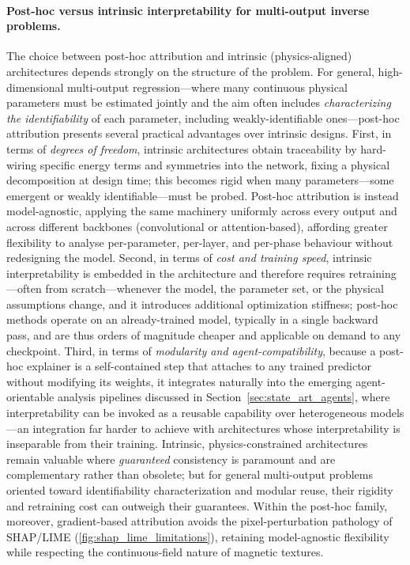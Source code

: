 \documentclass[letterpaper, 12, one column]{article}
\begin{document}
\paragraph{Post-hoc versus intrinsic interpretability for multi-output inverse problems.}
{\color[rgb]{0,0,1}The choice between post-hoc attribution and intrinsic (physics-aligned) architectures depends strongly on the structure of the problem. For general, high-dimensional multi-output regression---where many continuous physical parameters must be estimated jointly and the aim often includes \emph{characterizing the identifiability} of each parameter, including weakly-identifiable ones---post-hoc attribution presents several practical advantages over intrinsic designs. First, in terms of \emph{degrees of freedom}, intrinsic architectures obtain traceability by hard-wiring specific energy terms and symmetries into the network, fixing a physical decomposition at design time; this becomes rigid when many parameters---some emergent or weakly identifiable---must be probed. Post-hoc attribution is instead model-agnostic, applying the same machinery uniformly across every output and across different backbones (convolutional or attention-based), affording greater flexibility to analyse per-parameter, per-layer, and per-phase behaviour without redesigning the model. Second, in terms of \emph{cost and training speed}, intrinsic interpretability is embedded in the architecture and therefore requires retraining---often from scratch---whenever the model, the parameter set, or the physical assumptions change, and it introduces additional optimization stiffness; post-hoc methods operate on an already-trained model, typically in a single backward pass, and are thus orders of magnitude cheaper and applicable on demand to any checkpoint. Third, in terms of \emph{modularity and agent-compatibility}, because a post-hoc explainer is a self-contained step that attaches to any trained predictor without modifying its weights, it integrates naturally into the emerging agent-orientable analysis pipelines discussed in Section~\ref{sec:state_art_agents}, where interpretability can be invoked as a reusable capability over heterogeneous models---an integration far harder to achieve with architectures whose interpretability is inseparable from their training. Intrinsic, physics-constrained architectures remain valuable where \emph{guaranteed} consistency is paramount and are complementary rather than obsolete; but for general multi-output problems oriented toward identifiability characterization and modular reuse, their rigidity and retraining cost can outweigh their guarantees. Within the post-hoc family, moreover, gradient-based attribution avoids the pixel-perturbation pathology of SHAP/LIME (\cref{fig:shap_lime_limitations}), retaining model-agnostic flexibility while respecting the continuous-field nature of magnetic textures.}
\end{document}
